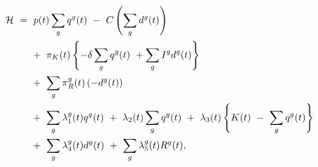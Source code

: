 \begin{equation}
\begin{split}
    \mathcal{H} \ 
    & = \ p(t) \sum_{g} q^{g}(t) \ - \ C\left( \sum_{g} d^{g}(t) \right) \\
    & \hspace{0.5cm} + \ \pi_{K}(t) \left\{ - \delta \sum_{g} q^{g}(t) \ + \sum_{g} I^{g} d^{g}(t) \right\} \\
    & \hspace{0.5cm} + \ \sum_{g} \pi_{R}^{g}(t) \left( -d^{g}(t) \right) \\ 
    & \hspace{0.5cm} + \ \sum_{g} \lambda_{1}^{g}(t) q^{g}(t) \ + \ \lambda_{2}(t) \sum_{g} q^{g}(t) \ + \ \lambda_{3}(t) \left\{ K(t) \ - \ \sum_{g} q^{g}(t) \right\} \\
    & \hspace{0.5cm} + \ \sum_{g} \lambda_{4}^{g}(t) d^{g}(t) \ + \ \sum_{g} \lambda_{5}^{g}(t) R^{g}(t),
\end{split}
\label{Equation:AKS-Style-Model_Current-Value-Hamiltonian}
\end{equation}
